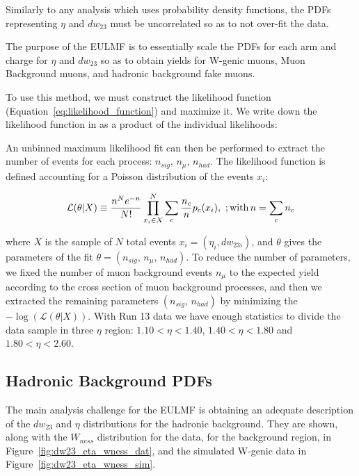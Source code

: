 Similarly to any analysis which uses probability density functions, the PDFs
representing $\eta$ and $dw_{23}$ must be uncorrelated so as to not over-fit
the data.

The purpose of the EULMF is to essentially scale the PDFs for each arm and
charge for $\eta$ and $dw_{23}$ so as to obtain yields for W-genic muons, Muon
Background muons, and hadronic background fake muons.

To use this method, we must construct the likelihood function
(Equation~\ref{eq:likelihood_function}) and maximize it. We write down the
likelihood function in as a product of the individual likelihoods:


An unbinned maximum likelihood fit can then be performed to extract the number
of events for each process: $n_{sig},\,n_\mu,\, n_{had}$. The likelihood
function is defined accounting for a Poisson  distribution of the events $x_i$:

\begin{equation} 
  \mathcal{L}(\theta|X) 
  \equiv
  \frac{n^N e^{-n}}{N!} \prod_{x_i \in X}^N
  \sum_c \frac{n_c}{n} p_c (x_i), \
  ;{\rm with}\, 
  n=\sum_c n_c 
  \label{eq:likelihood_function}
\end{equation} 

where $X$ is the sample of $N$ total events $x_i = (\eta_i,dw_{23i})$, and
$\theta$ gives the parameters of the fit $\theta = (n_{sig},\,n_\mu,\,
n_{had})$.  To reduce the number of parameters, we fixed the number of muon
background events $n_\mu$ to the expected yield according to the cross section
of muon background processes, and then we extracted the remaining parameters
$(n_{sig},\, n_{had})$ by minimizing the $-\log(\mathcal{L}(\theta|X))$.  With
Run 13 data we have enough statistics to divide the data sample in three $\eta$
region: $1.10 < \eta < 1.40$, $1.40 < \eta < 1.80$ and $1.80 < \eta < 2.60$. 

\subsection{Hadronic Background PDFs}

The main analysis challenge for the EULMF is obtaining an adequate description
of the $dw_{23}$ and $\eta$ distributions for the hadronic background. They are
shown, along with the $W_{ness}$ distribution for the data, for the background
region, in Figure~\ref{fig:dw23_eta_wness_dat}, and the simulated W-genic data
in Figure~\ref{fig:dw23_eta_wness_sim}.

